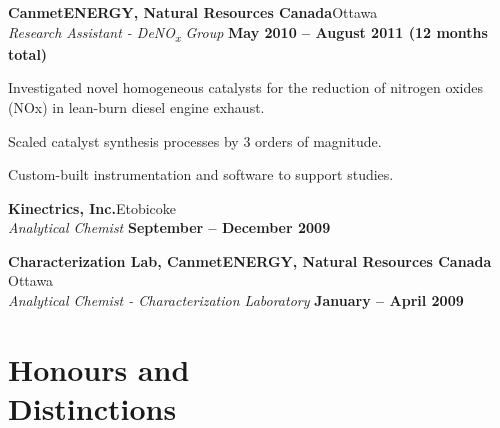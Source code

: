 \documentclass[margin,line]{resumecls}
\begin{document}
\begin{resume}
    \textbf{CanmetENERGY, Natural Resources Canada}\hfill Ottawa \\\vspace{1mm}%
    \textsl{Research Assistant - DeNO\textsubscript{x} Group} \hfill \textbf{May 2010 -- August 2011 (12 months total)}\\\vspace{-5mm}%
    \begin{list2}
        \item Investigated novel homogeneous catalysts for the reduction of nitrogen oxides (NOx) in lean-burn diesel engine exhaust.
        \item Scaled catalyst synthesis processes by 3 orders of magnitude.
        \item Custom-built instrumentation and software to support studies.
    \end{list2}

    \textbf{Kinectrics, Inc.}\hfill Etobicoke \\\vspace{1mm}%
    \textsl{Analytical Chemist} \hfill \textbf{September -- December 2009}\\\vspace{-5mm}

    \textbf{Characterization Lab, CanmetENERGY, Natural Resources Canada} \hfill Ottawa \\\vspace{1mm}%
    \textsl{Analytical Chemist - Characterization Laboratory} \hfill \textbf{January -- April 2009}\\

\newpage
    \section{\mysidestyle Honours and\\Distinctions}


\end{resume}
\end{document}
